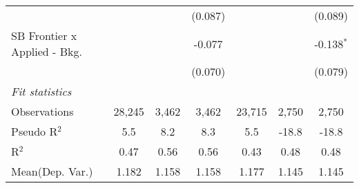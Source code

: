 \begin{tabular}{lcccccc}
                                  &               &         & (0.087) &               &               & (0.089)\\   
   SB Frontier x Applied - Bkg.   &               &         & -0.077  &               &               & -0.138$^{*}$\\   
                                  &               &         & (0.070) &               &               & (0.079)\\   
   \midrule
   \emph{Fit statistics}\\
   Observations                   & 28,245        & 3,462   & 3,462   & 23,715        & 2,750         & 2,750\\  
   Pseudo R$^2$                   & 5.5           & 8.2     & 8.3     & 5.5           & -18.8         & -18.8\\  
   R$^2$                          & 0.47          & 0.56    & 0.56    & 0.43          & 0.48          & 0.48\\  
Mean(Dep. Var.) & 1.182 & 1.158 & 1.158 & 1.177 & 1.145 & 1.145 \\
   

\end{tabular}
